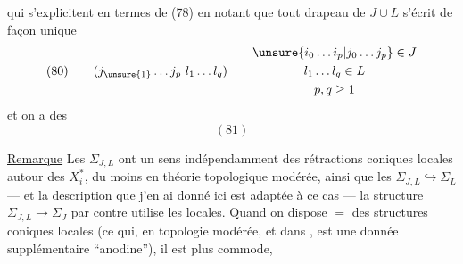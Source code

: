 
qui s'explicitent en termes de (78) en notant que tout drapeau de $J\cup L$  s'écrit de façon unique
\[
(80)\qquad(j_{\unsure{1}}\ldots j_p\ l_1\ldots l_q)\qquad
\begin{gathered}
\unsure{i_0\ldots i_p|j_0\ldots j_p}\in J\\
l_1\ldots l_q\in L\\
p,q\geq1
\end{gathered}
\]
et  on a des
\[(81)\]

\uline{Remarque} Les $\Sigma_{J,L}$ ont un sens  indépendamment des rétractions coniques locales autour des $X_i^*$, du moins en théorie topologique modérée, ainsi que les $\Sigma_{J,L}\hookrightarrow\Sigma_L$ --- et la description que j'en ai donné ici est adaptée à ce cas --- la structure $\Sigma_{J,L}\to\Sigma_J$ par contre utilise les   locales. Quand on dispose $=$ des structures coniques locales (ce qui, en topologie modérée, et dans , est une donnée supplémentaire ``anodine''), il est plus commode,
